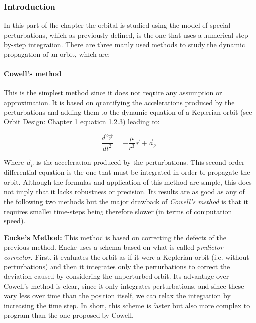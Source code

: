 \subsubsection{Introduction}
In this part of the chapter the orbital is studied using the model of special perturbations, which as previously defined, is the one that uses a numerical step-by-step integration. There are three manly used methods to study the dynamic propagation of an orbit, which are:\\

\paragraph{Cowell's method} This is the simplest method since it does not require any assumption or approximation. It is based on quantifying the accelerations produced by the perturbations and adding them to the dynamic equation of a Keplerian orbit (see Orbit Design: Chapter 1 equation 1.2.3) leading to:

\begin{equation}\label{eq:ode}
\frac{d^2 \vec{r}}{d t^2}=-\frac{\mu}{r^3}\vec{r}+\vec{a}_p
\end{equation}

Where $\vec{a}_p$ is the acceleration produced by the perturbations. This second order differential equation is the one that must be integrated in order to propagate the orbit. Although the formulas and application of this method are simple, this does not imply that it lacks robustness or precision. Its results are as good as any of the following two methods but the major drawback of \textit{Cowell's method} is that it requires smaller time-steps being therefore slower (in terms of computation speed).

\textbf{Encke's Method:} This method is based on correcting the defects of the previous method. Encke uses a schema based on what is called \textit{predictor-corrector}. First, it evaluates the orbit as if it were a Keplerian orbit (i.e. without perturbations) and then it integrates only the perturbations to correct the deviation caused by considering the unperturbed orbit. Its advantage over Cowell's method is clear, since it only integrates perturbations, and since these vary less over time than the position itself, we can relax the integration by increasing the time step. In short, this scheme is faster but also more complex to program than the one proposed by Cowell.

